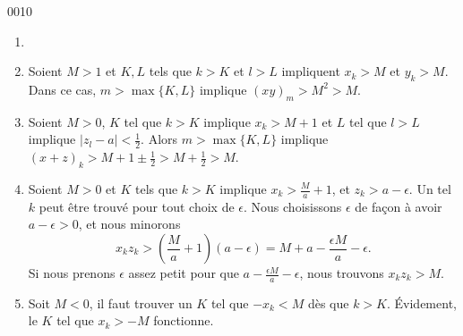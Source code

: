 
\begin{corrige}{0010}

\begin{enumerate}
\item 
\item Soient $M>1$ et $K,L$ tels que $k>K$ et $l>L$ impliquent $x_k>M$ et $y_k>M$. Dans ce cas, $m>\max\{K,L\}$ implique $(xy)_m>M^2>M$.
\item Soient $M>0$, $K$ tel que $k>K$ implique $x_k>M+1$ et $L$ tel que $l>L$ implique $| z_l-a |<\frac{ 1 }{2}$. Alors $m>\max\{ K,L \}$ implique $(x+z)_k>M+1\pm\frac{ 1 }{2}>M+\frac{ 1 }{2}>M$.
\item Soient $M>0$ et $K$ tels que $k>K$ implique $x_k>\frac{ M }{ a }+1$, et $z_k>a-\epsilon$. Un tel $k$ peut être trouvé pour tout choix de $\epsilon$. Nous choisissons $\epsilon$ de façon à avoir $a-\epsilon>0$, et nous minorons
\begin{equation}
	x_kz_k>\left( \frac{ M }{ a }+1 \right)(a-\epsilon)=M+a-\frac{ \epsilon M }{ a }-\epsilon.
\end{equation}
Si nous prenons $\epsilon$ assez petit pour que $a-\frac{ \epsilon M }{ a }-\epsilon$, nous trouvons $x_kz_k>M$.

\item Soit $M<0$, il faut trouver un $K$ tel que $-x_k<M$ dès que $k>K$. Évidement, le $K$ tel que $x_k>-M$ fonctionne.

\end{enumerate}

\end{corrige}
